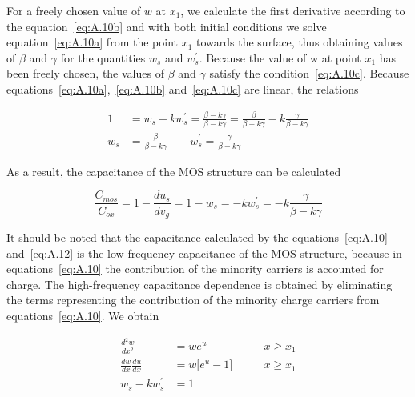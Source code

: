 For a freely chosen value of $w$ at $x_1$, we calculate the first
derivative according to the equation~\ref{eq:A.10b} and with both
initial conditions we solve equation~\ref{eq:A.10a} from the point
$x_1$ towards the surface, thus obtaining values of $\beta$ and
$\gamma$ for the quantities $w_s$ and $w^{'}_s$.  Because the value of
w at point $x_1$ has been freely chosen, the values of $\beta$ and
$\gamma$ satisfy the condition~\ref{eq:A.10c}. Because
equations~\ref{eq:A.10a},~\ref{eq:A.10b} and~\ref{eq:A.10c} are
linear, the relations

\begin{samepage}
  \begin{subequations}\label{eq:A.11}
    \begin{align}
      1 &= w_s - kw^{'}_s = \frac{\beta - k\gamma}{\beta - k\gamma} = \frac{\beta}{\beta -k\gamma} - k\frac{\gamma}{\beta -k\gamma} \\[0.3cm]
      w_s &= \frac{\beta}{\beta -k\gamma} \qquad w^{'}_s = \frac{\gamma}{\beta -k\gamma}
    \end{align}
  \end{subequations}
\end{samepage}

As a result, the capacitance of the MOS structure can be calculated

\begin{equation}\label{eq:A.12}
  \frac{C_{mos}}{C_{ox}} = 1 - \frac{du_s}{dv_g} = 1 - w_s = -kw^{'}_s = -k\frac{\gamma}{\beta - k\gamma}
\end{equation}

It should be noted that the capacitance calculated by the equations~\ref{eq:A.10}
and~\ref{eq:A.12} is the low-frequency capacitance of the MOS structure, because in
equations~\ref{eq:A.10} the contribution of the minority carriers is accounted for
charge. The high-frequency capacitance dependence is obtained by eliminating
the terms representing the contribution of the minority charge carriers from
equations~\ref{eq:A.10}. We obtain

\begin{samepage}
  \begin{subequations}\label{eq:A.13}
    \begin{align}
      \frac{d^{2}w}{dx^{2}} &= we^{u} \qquad &{x\ge{x_1}}                 \label{eq:A.13a} \\[0.3cm]
      \frac{dw}{dx}\frac{du}{dx} &= w \big[e^u-1\big] \qquad &{x\ge{x_1}} \label{eq:A.13b} \\[0.3cm]
      w_s-kw_s^{'} &= 1 \label{eq:A.13c}
    \end{align}
  \end{subequations}
\end{samepage}

